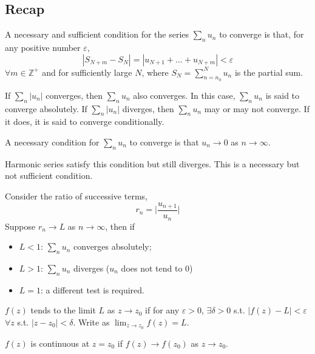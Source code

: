 \documentclass[a4paper]{article}
\begin{document}
\subsection{Recap}
\begin{prop}
A necessary and sufficient condition for the series $\sum_nu_n$ to converge is that, for any positive number $\varepsilon$,
$$|S_{N+m}-S_N|=|u_{N+1}+\dots+u_{N+m}|<\varepsilon$$
$\forall m\in\mathbb{Z}^+$ and for sufficiently large $N$, where $S_N=\sum_{n=n_0}^Nu_n$ is the partial sum.
\end{prop}
\begin{defi}
If $\sum_n|u_n|$ converges, then $\sum_nu_n$ also converges. In this case, $\sum_nu_n$ is said to converge absolutely. If $\sum_n|u_n|$ diverges, then $\sum_nu_n$ may or may not converge. If it does, it is said to converge conditionally.
\end{defi}
\begin{prop}
A necessary condition for $\sum_nu_n$ to converge is that $u_n\rightarrow 0$ as $n\rightarrow \infty$.
\end{prop}
\begin{eg}
Harmonic series satisfy this condition but still diverges. This is a necessary but not sufficient condition.
\end{eg}
\begin{prop}
Consider the ratio of successive terms, 
\begin{equation}
r_n=\bigg|\frac{u_{n+1}}{u_n}\bigg|\tag{6.1}
\end{equation}
Suppose $r_n\rightarrow L$ as $n\rightarrow\infty$, then if
\begin{itemize}
    \item $L<1$: $\sum_nu_n$ converges absolutely;
    \item $L>1$: $\sum_nu_n$ diverges ($u_n$ does not tend to 0)
    \item $L=1$: a different test is required.
\end{itemize}
\end{prop}
\begin{defi}[Limits]
$f(z)$ tends to the limit $L$ as $z\rightarrow z_0$ if for any $\varepsilon>0$, $\exists\delta>0$ s.t. $|f(z)-L|<\varepsilon$ $\forall z$ s.t. $|z-z_0|<\delta$. Write as $\lim_{z\rightarrow z_0}f(z)=L$.
\end{defi}
\begin{defi}[Continuity]
$f(z)$ is continuous at $z=z_0$ if $f(z)\rightarrow f(z_0)$ as $z\rightarrow z_0$.
\end{defi}
\end{document}
